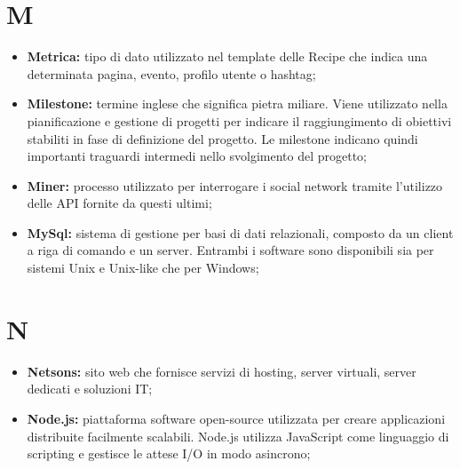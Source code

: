 \section*{\Huge M} %
\label{sec:m}
	\begin{itemize}
		\item \textbf{Metrica:} tipo di dato utilizzato nel template delle Recipe che indica una determinata pagina, evento, profilo utente o hashtag;
		\item \textbf{Milestone:} termine inglese che significa pietra miliare. Viene utilizzato nella pianificazione e gestione di progetti per indicare il raggiungimento di obiettivi stabiliti in fase di definizione del progetto. Le milestone indicano quindi importanti traguardi intermedi nello svolgimento del progetto;
		\item \textbf{Miner:} processo utilizzato per interrogare i social network tramite l'utilizzo delle API fornite da questi ultimi;	
		\item \textbf{MySql:} sistema di gestione per basi di dati relazionali, composto da un client a riga di comando e un server. Entrambi i software sono disponibili sia per sistemi Unix e Unix-like che per Windows;
	\end{itemize}
\pagebreak

\section*{\Huge N} %
\label{sec:n}
	\begin{itemize}
		\item \textbf{Netsons:} sito web che fornisce servizi di hosting, server virtuali, server dedicati e soluzioni IT;
		\item \textbf{Node.js:} piattaforma software open-source utilizzata per creare applicazioni distribuite facilmente scalabili. Node.js utilizza JavaScript come linguaggio di scripting e gestisce le attese I/O in modo asincrono;
	\end{itemize}
\pagebreak
